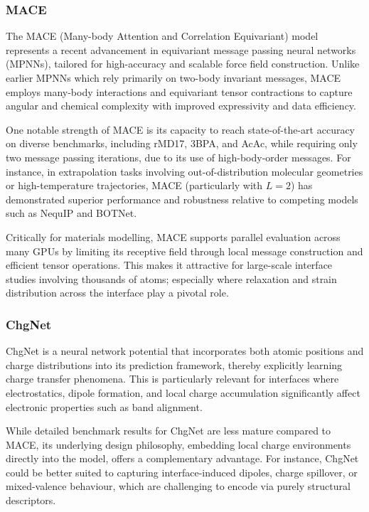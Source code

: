 \subsubsection{MACE}

The MACE (Many-body Attention and Correlation Equivariant) model represents a recent advancement in equivariant message passing neural networks (MPNNs), tailored for high-accuracy and scalable force field construction. Unlike earlier MPNNs which rely primarily on two-body invariant messages, MACE employs many-body interactions and equivariant tensor contractions to capture angular and chemical complexity with improved expressivity and data efficiency.

One notable strength of MACE is its capacity to reach state-of-the-art accuracy on diverse benchmarks, including rMD17, 3BPA, and AcAc, while requiring only two message passing iterations, due to its use of high-body-order messages. For instance, in extrapolation tasks involving out-of-distribution molecular geometries or high-temperature trajectories, MACE (particularly with $L=2$) has demonstrated superior performance and robustness relative to competing models such as NequIP and BOTNet.

Critically for materials modelling, MACE supports parallel evaluation across many GPUs by limiting its receptive field through local message construction and efficient tensor operations. This makes it attractive for large-scale interface studies involving thousands of atoms; especially where relaxation and strain distribution across the interface play a pivotal role.

\subsubsection{ChgNet}

ChgNet is a neural network potential that incorporates both atomic positions and charge distributions into its prediction framework, thereby explicitly learning charge transfer phenomena. This is particularly relevant for interfaces where electrostatics, dipole formation, and local charge accumulation significantly affect electronic properties such as band alignment.

While detailed benchmark results for ChgNet are less mature compared to MACE, its underlying design philosophy, embedding local charge environments directly into the model, offers a complementary advantage. For instance, ChgNet could be better suited to capturing interface-induced dipoles, charge spillover, or mixed-valence behaviour, which are challenging to encode via purely structural descriptors.

